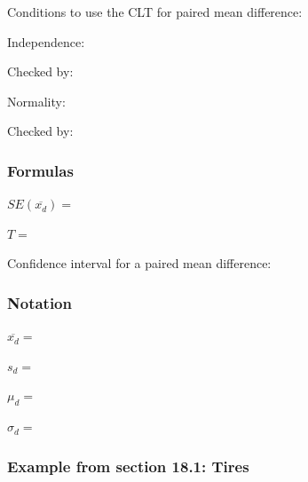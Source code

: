 \documentclass[
]{report}
\newcommand{\rgs}{\vspace{12pt}} %
\newcommand{\rgi}{\hspace{24pt}}  %
\begin{document}
Conditions to use the CLT for paired mean difference:

\rgi Independence:
\rgs

\rgi \rgi Checked by:
\rgs 

\rgi Normality:
\rgs

\rgi \rgi Checked by:
\rgs

\hypertarget{formulas-4}{%
\subsubsection*{Formulas}\label{formulas-4}}

\(SE(\overline{x_d})=\)
\rgs

\(T=\)
\rgs

Confidence interval for a paired mean difference:
\rgs

\hypertarget{notation-3}{%
\subsubsection*{Notation}\label{notation-3}}

\(\overline{x_d}=\)
\rgs

\(s_d=\)
\rgs

\(\mu_d=\)
\rgs

\(\sigma_d=\)
\rgs

\hypertarget{example-from-section-18.1-tires}{%
\subsubsection*{Example from section 18.1: Tires}\label{example-from-section-18.1-tires}}
\end{document}
